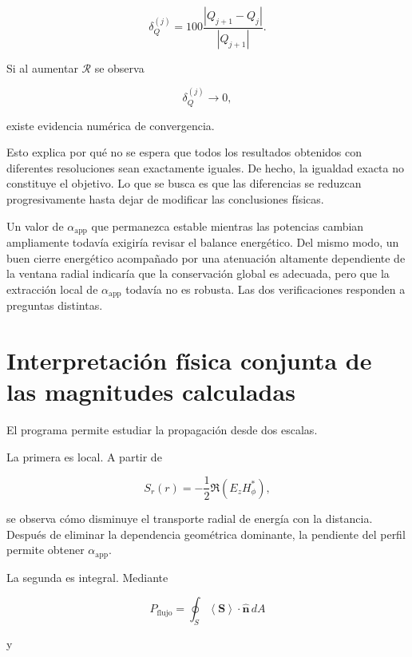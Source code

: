 \begin{equation}
\delta_Q^{(j)}
=
100
\frac{
|Q_{j+1}-Q_j|
}{
|Q_{j+1}|
}.
\end{equation}

Si al aumentar $\mathcal{R}$ se observa

\begin{equation}
\delta_Q^{(j)}
\rightarrow0,
\end{equation}

existe evidencia numérica de convergencia.

Esto explica por qué no se espera que todos los resultados obtenidos con diferentes resoluciones sean exactamente iguales. De hecho, la igualdad exacta no constituye el objetivo. Lo que se busca es que las diferencias se reduzcan progresivamente hasta dejar de modificar las conclusiones físicas.

Un valor de $\alpha_{\mathrm{app}}$ que permanezca estable mientras las potencias cambian ampliamente todavía exigiría revisar el balance energético. Del mismo modo, un buen cierre energético acompañado por una atenuación altamente dependiente de la ventana radial indicaría que la conservación global es adecuada, pero que la extracción local de $\alpha_{\mathrm{app}}$ todavía no es robusta. Las dos verificaciones responden a preguntas distintas.

\section{Interpretación física conjunta de las magnitudes calculadas}

El programa permite estudiar la propagación desde dos escalas.

La primera es local. A partir de

\begin{equation}
S_r(r)
=
-\frac{1}{2}
\Re
\left(
E_zH_\phi^*
\right),
\end{equation}

se observa cómo disminuye el transporte radial de energía con la distancia. Después de eliminar la dependencia geométrica dominante, la pendiente del perfil permite obtener $\alpha_{\mathrm{app}}$.

La segunda es integral. Mediante

\begin{equation}
P_{\mathrm{flujo}}
=
\oint_S
\left\langle\mathbf{S}\right\rangle
\cdot\hat{\mathbf n}\,dA
\end{equation}

y


